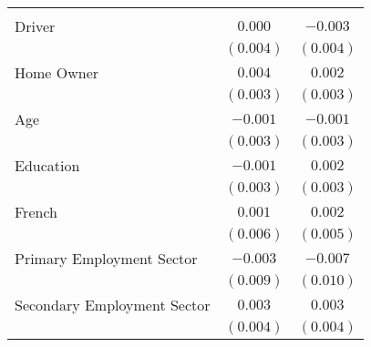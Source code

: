 \begin{center}
\begin{tiny}
\begin{longtable}{l@{} c@{} c@{}}
                                                                                                       &                 &                  \\
\quad Driver                                                                                           & $0.000$         & $-0.003$         \\
                                                                                                       & $(0.004)$       & $(0.004)$        \\
\quad Home Owner                                                                                       & $0.004$         & $0.002$          \\
                                                                                                       & $(0.003)$       & $(0.003)$        \\
\quad Age                                                                                              & $-0.001$        & $-0.001$         \\
                                                                                                       & $(0.003)$       & $(0.003)$        \\
\quad Education                                                                                        & $-0.001$        & $0.002$          \\
                                                                                                       & $(0.003)$       & $(0.003)$        \\
\quad French                                                                                           & $0.001$         & $0.002$          \\
                                                                                                       & $(0.006)$       & $(0.005)$        \\
\quad Primary Employment Sector                                                                        & $-0.003$        & $-0.007$         \\
                                                                                                       & $(0.009)$       & $(0.010)$        \\
\quad Secondary Employment Sector                                                                      & $0.003$         & $0.003$          \\
                                                                                                       & $(0.004)$       & $(0.004)$        \\

\end{longtable}
\end{tiny}
\end{center}
